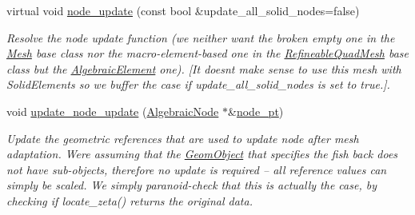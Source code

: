 \begin{DoxyCompactItemize}
virtual void \hyperlink{classoomph_1_1AlgebraicFishMesh_a39cd5a86b0f762efd09f4fefba6da1c3}{node\+\_\+update} (const bool \&update\+\_\+all\+\_\+solid\+\_\+nodes=false)
\begin{DoxyCompactList}\small\item\em Resolve the node update function (we neither want the broken empty one in the \hyperlink{classoomph_1_1Mesh}{Mesh} base class nor the macro-\/element-\/based one in the \hyperlink{classoomph_1_1RefineableQuadMesh}{Refineable\+Quad\+Mesh} base class but the \hyperlink{classoomph_1_1AlgebraicElement}{Algebraic\+Element} one). \mbox{[}It doesn\textquotesingle{}t make sense to use this mesh with Solid\+Elements so we buffer the case if update\+\_\+all\+\_\+solid\+\_\+nodes is set to true.\mbox{]}. \end{DoxyCompactList}\item 
void \hyperlink{classoomph_1_1AlgebraicFishMesh_a4f992939c299f87abc762c14aab50b5c}{update\+\_\+node\+\_\+update} (\hyperlink{classoomph_1_1AlgebraicNode}{Algebraic\+Node} $\ast$\&\hyperlink{classoomph_1_1AlgebraicMesh_aedeebbe95d2f8e67e9939cecd1be3933}{node\+\_\+pt})
\begin{DoxyCompactList}\small\item\em Update the geometric references that are used to update node after mesh adaptation. We\textquotesingle{}re assuming that the \hyperlink{classoomph_1_1GeomObject}{Geom\+Object} that specifies the fish back does not have sub-\/objects, therefore no update is required -- all reference values can simply be scaled. We simply paranoid-\/check that this is actually the case, by checking if locate\+\_\+zeta() returns the original data. \end{DoxyCompactList}\end{DoxyCompactItemize}
